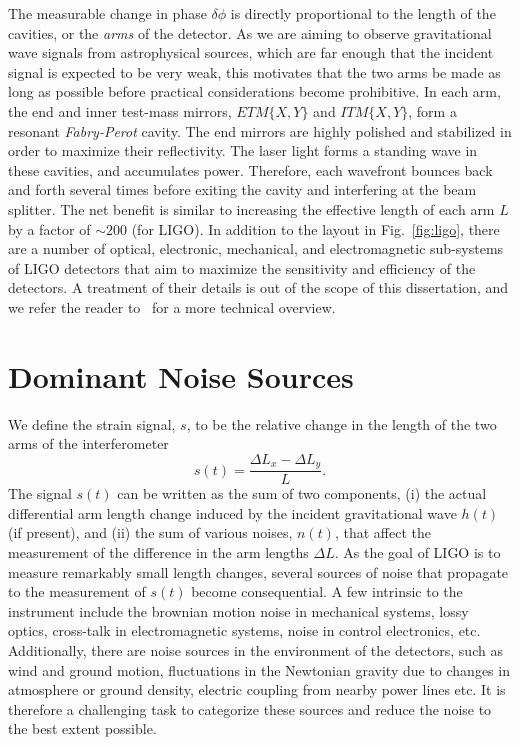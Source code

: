 The measurable change in phase $\delta\phi$ is directly 
proportional to the length of the cavities, or the {\it arms} of the detector.
As we are aiming to observe gravitational wave signals from 
astrophysical sources, which are far enough that the incident signal is
expected to be very weak, this motivates that the two arms be made as 
long as possible before practical considerations become prohibitive.
% 
In each arm, the end and inner test-mass mirrors, $ETM\{X,Y\}$ and 
$ITM\{X,Y\}$, form a resonant {\it Fabry-Perot} cavity. The end mirrors are 
highly polished and stabilized in order to maximize their reflectivity. 
The laser light forms a standing wave in these cavities, and accumulates power.
Therefore, each 
wavefront bounces back and forth several times before exiting the cavity and 
interfering at the beam splitter. The net benefit is similar to increasing the
effective length of each arm $L$ by a factor of $\sim 200$ (for LIGO). 
% 
In addition to the layout in Fig.~\ref{fig:ligo}, there are a number of
optical, electronic, mechanical, and electromagnetic sub-systems of LIGO 
detectors that aim to maximize the sensitivity and efficiency of the detectors.
A treatment of their details is out of the scope of this dissertation, and we
refer the reader to~\cite{lrr-2011-5,Harry:2010zz} for a more technical overview.



\section{Dominant Noise Sources}\label{sec:ligo_noise}

We define the strain signal, $s$, to be the relative change in the length 
of the two arms of the interferometer
% 
\begin{equation}
 s(t) = \dfrac{\Delta L_x - \Delta L_y}{L}.
\end{equation}
% 
The signal $s(t)$ can be written as the sum of two components, (i) the actual
differential arm length change induced by the incident gravitational wave 
$h(t)$ (if present), and (ii) the sum of various noises, $n(t)$, that affect 
the measurement of the difference in the arm lengths $\Delta L$. 
%
As the goal of LIGO is to measure remarkably small length changes, several
sources of noise that propagate to the measurement of $s(t)$ become 
consequential. A few intrinsic to the instrument include the brownian motion
noise in mechanical systems, lossy optics, cross-talk in electromagnetic
systems, noise in control electronics, etc. Additionally, there are noise 
sources in the environment of the detectors, such as wind and ground motion,
fluctuations in the Newtonian gravity due to changes in atmosphere or ground
density, electric coupling from nearby power lines etc. 
%
It is therefore a challenging task to categorize these sources and reduce the
noise to the best extent possible.


